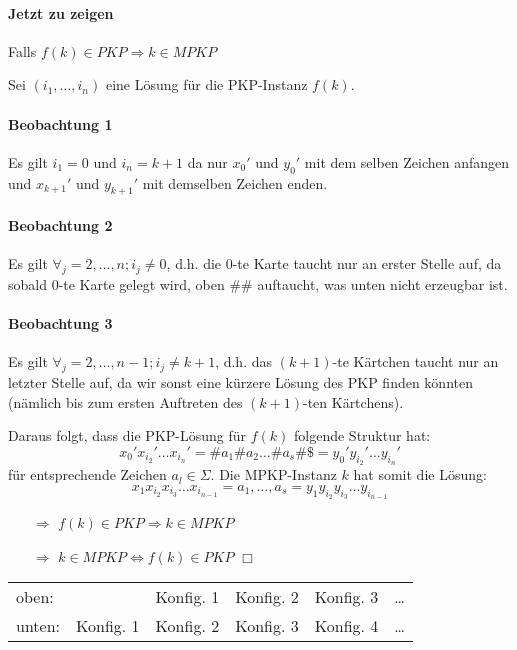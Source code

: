 \paragraph*{Jetzt zu zeigen} Falls $f(k) \in PKP \Rightarrow k \in MPKP$

\para{} Sei $(i_1,\dots,i_n)$ eine Lösung für die PKP-Instanz $f(k)$.

\paragraph*{Beobachtung 1} Es gilt $i_1=0$ und $i_n=k+1$ da nur $x_0'$ und $y_0'$ mit dem selben Zeichen anfangen und $x_{k+1}'$ und $y_{k+1}'$ mit demselben Zeichen enden.

\paragraph*{Beobachtung 2} Es gilt $\forall_j=2,\dots,n; i_j \not=0$, d.h. die 0-te Karte taucht nur an erster Stelle auf, da sobald 0-te Karte gelegt wird, oben \#\# auftaucht, was unten nicht erzeugbar ist.

\paragraph*{Beobachtung 3} Es gilt $\forall_j=2,\dots,n-1; i_j \not= k+1$, d.h. das $(k+1)$-te Kärtchen taucht nur an letzter Stelle auf, da wir sonst eine kürzere Lösung des PKP finden könnten (nämlich bis zum ersten Auftreten des $(k+1)$-ten Kärtchens).

\para{} Daraus folgt, dass die PKP-Lösung für $f(k)$ folgende Struktur hat: $$ x_0'x_{i_2}'\dots x_{i_n}' = \#a_1\#a_2\dots\#a_s\#\$ = y_0'y_{i_2}'\dots y_{i_n}' $$ für entsprechende Zeichen $a_l \in \Sigma$. Die MPKP-Instanz $k$ hat somit die Lösung: $$ x_1x_{i_2}x_{i_3}\dots x_{i_{n-1}} = a_1,\dots,a_s = y_1y_{i_2}y_{i_3}\dots y_{i_{n-1}} $$
\begin{itemize}
	\item[$\Rightarrow$] $f(k) \in PKP \Rightarrow k \in MPKP$
	\item[$\Rightarrow$] $k \in MPKP \Leftrightarrow f(k) \in PKP$ $\Box$
\end{itemize}


\begin{table}[htb!]
\begin{tabular}{l|l l l l l}
oben: & & Konfig. 1 & Konfig. 2 & Konfig. 3 & \dots \\
unten: & Konfig. 1 & Konfig. 2 & Konfig. 3 & Konfig. 4 & \dots \\
\end{tabular}
\end{table}

